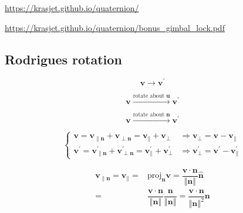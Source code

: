\documentclass[
]{book}
\theoremstyle{definition}
\theoremstyle{definition}
\theoremstyle{definition}
\theoremstyle{definition}
\theoremstyle{remark}
\begin{document}
\url{https://krasjet.github.io/quaternion/}

\url{https://krasjet.github.io/quaternion/bonus_gimbal_lock.pdf}

\subsection{Rodrigues rotation}\label{rodrigues-rotation}

\[
\boldsymbol{v}\rightarrow\boldsymbol{v}^{\prime}
\]

\[
\boldsymbol{v}\xrightarrow{\text{rotate about }\boldsymbol{u}}\boldsymbol{v}^{\prime}
\]

\[
\boldsymbol{v}\xrightarrow{\text{rotate about }\boldsymbol{n}}\boldsymbol{v}^{\prime}
\]

\[
\begin{cases}
\boldsymbol{v}=\boldsymbol{v}_{{\scriptscriptstyle \parallel\boldsymbol{n}}}+\boldsymbol{v}_{{\scriptscriptstyle \perp\boldsymbol{n}}}=\boldsymbol{v}_{{\scriptscriptstyle \parallel}}+\boldsymbol{v}_{{\scriptscriptstyle \perp}} & \Rightarrow\boldsymbol{v}_{{\scriptscriptstyle \perp}}=\boldsymbol{v}-\boldsymbol{v}_{{\scriptscriptstyle \parallel}}\\
\boldsymbol{v}^{\prime}=\boldsymbol{v}_{{\scriptscriptstyle \parallel\boldsymbol{n}}}^{\prime}+\boldsymbol{v}_{{\scriptscriptstyle \perp\boldsymbol{n}}}^{\prime}=\boldsymbol{v}_{{\scriptscriptstyle \parallel}}^{\prime}+\boldsymbol{v}_{{\scriptscriptstyle \perp}}^{\prime} & \Rightarrow\boldsymbol{v}_{{\scriptscriptstyle \perp}}^{\prime}=\boldsymbol{v}^{\prime}-\boldsymbol{v}_{{\scriptscriptstyle \parallel}}^{\prime}
\end{cases}
\]

\[
\begin{aligned}
\boldsymbol{v}_{{\scriptscriptstyle \parallel\boldsymbol{n}}}=\boldsymbol{v}_{{\scriptscriptstyle \parallel}}= & \mathrm{proj}_{{\scriptscriptstyle \boldsymbol{n}}}\boldsymbol{v}=\dfrac{\boldsymbol{v}\cdot\boldsymbol{n}}{\left\Vert \boldsymbol{n}\right\Vert }\hat{\boldsymbol{n}}\\
= & \dfrac{\boldsymbol{v}\cdot\boldsymbol{n}}{\left\Vert \boldsymbol{n}\right\Vert }\dfrac{\boldsymbol{n}}{\left\Vert \boldsymbol{n}\right\Vert }=\dfrac{\boldsymbol{v}\cdot\boldsymbol{n}}{\left\Vert \boldsymbol{n}\right\Vert ^{2}}\boldsymbol{n}
\end{aligned}
\]
\end{document}
